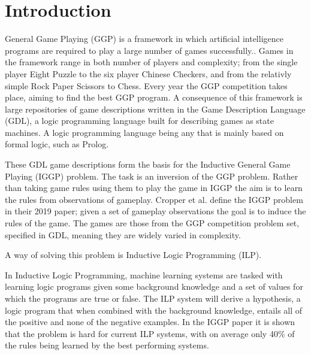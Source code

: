 
\chapter{Introduction}
General Game Playing (GGP) is a framework in which artificial intelligence programs are required to play a large number of games successfully.\cite{Genesereth/GGPOverview}.
Games in the framework range in both number of players and complexity; from the single player Eight Puzzle to the six player Chinese Checkers, and from the relativly simple Rock Paper Scissors to Chess\cite{GGP-Website}. Every year the GGP competition takes place, aiming to find the best GGP program. A consequence of this framework is large repositories of game descriptions written in the Game Description Language (GDL), a logic programming language built for describing games as state machines\cite{GDL_Spec}. A logic programming language being any that is mainly based on formal logic, such as Prolog.



These GDL game descriptions form the basis for the Inductive General Game Playing (IGGP) problem. The task is an inversion of the GGP problem. Rather than taking game rules using them to play the game in IGGP the aim is to learn the rules from observations of gameplay. Cropper et al. define the IGGP problem in their 2019 paper; given a set of gameplay observations the goal is to induce the rules of the game\cite{Cropper/IGGP}. The games are those from the GGP competition problem set, specified in GDL, meaning they are widely varied in complexity.


A way of solving this problem is Inductive Logic Programming (ILP).

In Inductive Logic Programming, machine learning systems are tasked with learning logic programs given some background knowledge and a set of values for which the programs are true or false. The ILP system will derive a hypothesis, a logic program that when combined with the background knowledge, entails all of the positive and none of the negative examples\cite{Muggleton/ILP}. In the IGGP paper it is shown that the problem is hard for current ILP systems, with on average only 40\% of the rules being learned by the best performing systems.

